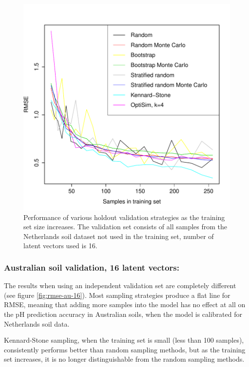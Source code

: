\documentclass{isprs}
\begin{document}
\begin{figure}[ht!]
\includegraphics[width=1.0\columnwidth]{../script/output/rmse-nl-16.pdf}
\begin{center}
    \caption{Performance of various holdout validation strategies as the training set size increases. The validation set consists of all samples from the Netherlands soil dataset not used in the training set, number of latent vectors used is 16.}
    \label{fig:rmse-nl-16}
\end{center}
\end{figure}

\subsubsection{Australian soil validation, 16 latent vectors:}\label{sec:AU16}

The results when using an independent validation set are completely different (see figure \ref{fig:rmse-au-16}). Most sampling strategies produce a flat line for RMSE, meaning that adding more samples into the model has no effect at all on the pH prediction accuracy in Australian soils, when the model is calibrated for Netherlands soil data.

Kennard-Stone sampling, when the training set is small (less than 100 samples), consistently performs better than random sampling methods, but as the training set increases, it is no longer distinguishable from the random sampling methods.
\end{document}
